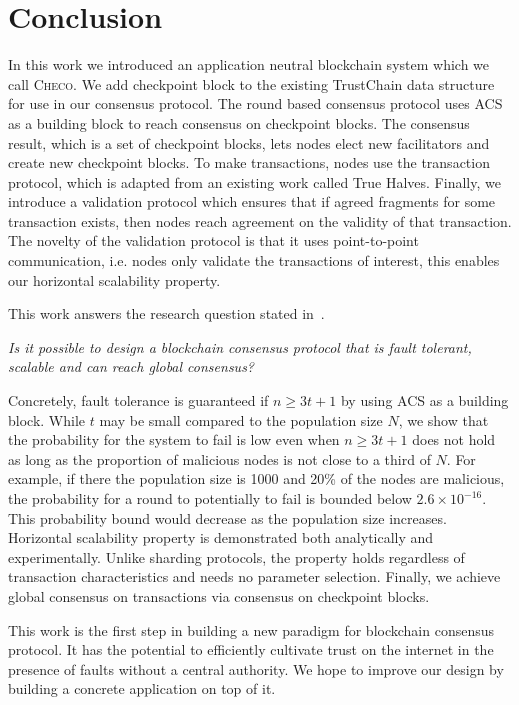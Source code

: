 \chapter{Conclusion}
\label{ch:conclusion}

In this work we introduced an application neutral blockchain system which we call \textsc{Checo}.
We add checkpoint block to the existing TrustChain data structure for use in our consensus protocol.
The round based consensus protocol uses ACS as a building block to reach consensus on checkpoint blocks.
The consensus result, which is a set of checkpoint blocks, lets nodes elect new facilitators and create new checkpoint blocks.
To make transactions, nodes use the transaction protocol,
which is adapted from an existing work called True Halves.
Finally, we introduce a validation protocol which ensures that if agreed fragments for some transaction exists,
then nodes reach agreement on the validity of that transaction.
The novelty of the validation protocol is that it uses point-to-point communication,
i.e. nodes only validate the transactions of interest,
this enables our horizontal scalability property.

This work answers the research question stated in~.
\begin{displayquote}
\emph{Is it possible to design a blockchain consensus protocol that is fault tolerant, scalable and can reach global consensus?}
\end{displayquote}
Concretely, fault tolerance is guaranteed if $n \ge 3t + 1$ by using ACS as a building block.
While $t$ may be small compared to the population size $N$,
we show that the probability for the system to fail is low even when $n \ge 3t + 1$ does not hold as long as the proportion of malicious nodes is not close to a third of $N$.
For example, if there the population size is 1000 and 20\% of the nodes are malicious,
the probability for a round to potentially to fail is bounded below $2.6 \times 10^{-16}$.
This probability bound would decrease as the population size increases.
Horizontal scalability property is demonstrated both analytically and experimentally.
Unlike sharding protocols, the property holds regardless of transaction characteristics and needs no parameter selection.
Finally, we achieve global consensus on transactions via consensus on checkpoint blocks.

This work is the first step in building a new paradigm for blockchain consensus protocol.
It has the potential to efficiently cultivate trust on the internet in the presence of faults without a central authority.
We hope to improve our design by building a concrete application on top of it.

